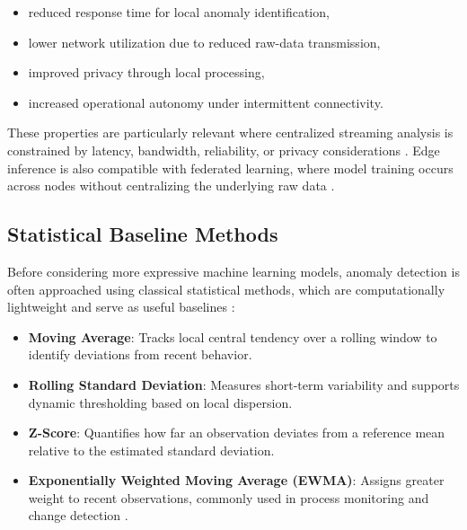\begin{itemize}
    \item reduced response time for local anomaly identification,
    \item lower network utilization due to reduced raw-data transmission,
    \item improved privacy through local processing,
    \item increased operational autonomy under intermittent connectivity.
\end{itemize}

These properties are particularly relevant where centralized streaming analysis is
constrained by latency, bandwidth, reliability, or privacy considerations
\cite{shi2016edge, satyanarayanan2017emergence}. Edge inference is also compatible with
federated learning, where model training occurs across nodes without centralizing the
underlying raw data \cite{mcmahan2017communication, kairouz2021advances}.

\subsection{Statistical Baseline Methods}
\label{subsec:edge_statistical}

Before considering more expressive machine learning models, anomaly detection is often
approached using classical statistical methods, which are computationally lightweight
and serve as useful baselines \cite{basseville1993detection, chandola2009anomaly}:

\begin{itemize}
    \item \textbf{Moving Average}: Tracks local central tendency over a rolling window
    to identify deviations from recent behavior.

    \item \textbf{Rolling Standard Deviation}: Measures short-term variability and
    supports dynamic thresholding based on local dispersion.

    \item \textbf{Z-Score}: Quantifies how far an observation deviates from a reference
    mean relative to the estimated standard deviation.

    \item \textbf{Exponentially Weighted Moving Average (EWMA)}: Assigns greater weight
    to recent observations, commonly used in process monitoring and change detection
    \cite{basseville1993detection}.
\end{itemize}

